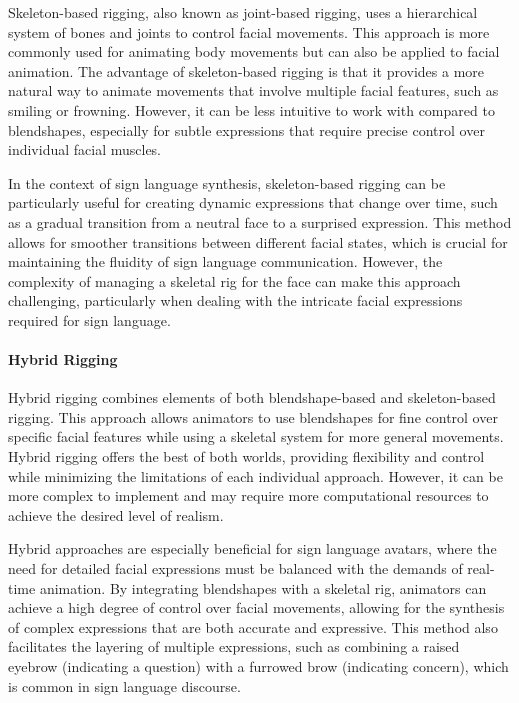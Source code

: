 \documentclass[../../main.tex]{subfiles}
\begin{document}
Skeleton-based rigging, also known as joint-based rigging, uses a hierarchical system of bones and joints to control facial movements. This approach is more commonly used for animating body movements but can also be applied to facial animation. The advantage of skeleton-based rigging is that it provides a more natural way to animate movements that involve multiple facial features, such as smiling or frowning. However, it can be less intuitive to work with compared to blendshapes, especially for subtle expressions that require precise control over individual facial muscles.

In the context of sign language synthesis, skeleton-based rigging can be particularly useful for creating dynamic expressions that change over time, such as a gradual transition from a neutral face to a surprised expression. This method allows for smoother transitions between different facial states, which is crucial for maintaining the fluidity of sign language communication. However, the complexity of managing a skeletal rig for the face can make this approach challenging, particularly when dealing with the intricate facial expressions required for sign language.

\paragraph{Hybrid Rigging}

Hybrid rigging combines elements of both blendshape-based and skeleton-based rigging. This approach allows animators to use blendshapes for fine control over specific facial features while using a skeletal system for more general movements. Hybrid rigging offers the best of both worlds, providing flexibility and control while minimizing the limitations of each individual approach. However, it can be more complex to implement and may require more computational resources to achieve the desired level of realism.

Hybrid approaches are especially beneficial for sign language avatars, where the need for detailed facial expressions must be balanced with the demands of real-time animation. By integrating blendshapes with a skeletal rig, animators can achieve a high degree of control over facial movements, allowing for the synthesis of complex expressions that are both accurate and expressive. This method also facilitates the layering of multiple expressions, such as combining a raised eyebrow (indicating a question) with a furrowed brow (indicating concern), which is common in sign language discourse.
\end{document}
